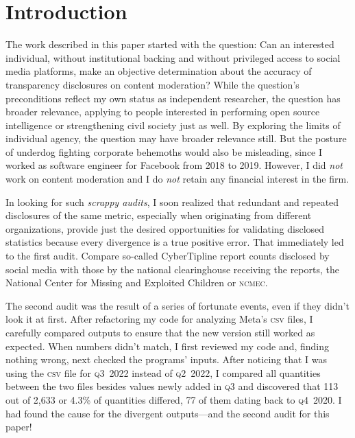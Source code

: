 \documentclass[nonacm,screen]{acmart}
\newcommand\V[1]{\textsc{\MakeLowercase{#1}}}
\begin{document}


\maketitle



\section{Introduction}
\label{sec:introduction}

The work described in this paper started with the question: Can an interested
individual, without institutional backing and without privileged access to
social media platforms, make an objective determination about the accuracy of
transparency disclosures on content moderation? While the question's
preconditions reflect my own status as independent researcher, the question has
broader relevance, applying to people interested in performing open source
intelligence or strengthening civil society just as well. By exploring the
limits of individual agency, the question may have broader relevance still. But
the posture of underdog fighting corporate behemoths would also be misleading,
since I worked as software engineer for Facebook from 2018 to 2019. However, I
did \emph{not} work on content moderation and I do \emph{not} retain any
financial interest in the firm.

In looking for such \emph{scrappy audits}, I soon realized that redundant and
repeated disclosures of the same metric, especially when originating from
different organizations, provide just the desired opportunities for validating
disclosed statistics because every divergence is a true positive error. That
immediately led to the first audit. Compare so-called CyberTipline report counts
disclosed by social media with those by the national clearinghouse receiving the
reports, the National Center for Missing and Exploited Children or \V{NCMEC}.

The second audit was the result of a series of fortunate events, even if they
didn't look it at first. After refactoring my code for analyzing Meta's \V{CSV}
files, I carefully compared outputs to ensure that the new version still worked
as expected. When numbers didn't match, I first reviewed my code and, finding
nothing wrong, next checked the programs' inputs. After noticing that I was
using the \V{CSV} file for \V{Q3}~2022 instead of \V{Q2}~2022, I compared all
quantities between the two files besides values newly added in \V{Q3} and
discovered that 113 out of 2,633 or 4.3\% of quantities differed, 77 of them
dating back to \V{Q4}~2020. I had found the cause for the divergent
outputs---and the second audit for this paper!
\end{document}
